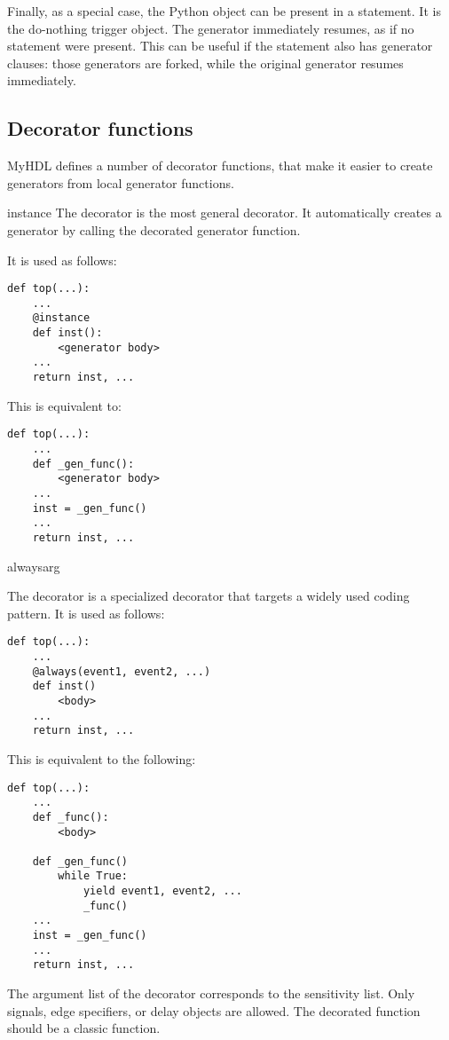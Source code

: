 Finally, as a special case, the Python  object can be
present in a  statement. It is the do-nothing
trigger object. The generator immediately resumes, as if no
 statement were present. This can be useful if the
 statement also has generator clauses: those generators
are forked, while the original generator resumes immediately.

\subsection{Decorator functions \label{ref-deco}}

MyHDL defines a number of decorator functions, that make it easier to
create generators from local generator functions.

\begin{funcdesc}{instance}{}
The  decorator is the most general decorator.  It
automatically creates a generator by calling the decorated generator function.

It is used as follows:

\begin{verbatim}
def top(...):
    ...
    @instance
    def inst():
        <generator body>
    ...
    return inst, ...
\end{verbatim}

This is equivalent to:

\begin{verbatim}
def top(...):
    ...
    def _gen_func():
        <generator body>
    ...
    inst = _gen_func()
    ...
    return inst, ...
\end{verbatim}

\end{funcdesc}
    

\begin{funcdesc}{always}{arg }

The  decorator is a specialized decorator that targets a widely used
coding pattern. It is used as follows:

\begin{verbatim}
def top(...):
    ...
    @always(event1, event2, ...)
    def inst()
        <body>
    ...
    return inst, ...
\end{verbatim}

This is equivalent to the following:

\begin{verbatim}
def top(...):
    ...
    def _func():
        <body>

    def _gen_func()
        while True:
            yield event1, event2, ... 
            _func()
    ...
    inst = _gen_func()
    ...
    return inst, ...
\end{verbatim}


The argument list of the decorator corresponds to the sensitivity
list. Only signals, edge specifiers, or delay objects are allowed.
The decorated function should be a classic function.


\end{funcdesc}


